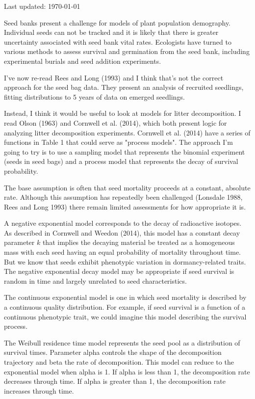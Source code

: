 \documentclass[12pt, oneside, titlepage]{article}   	%
\begin{document}
Last updated: \today

Seed banks present a challenge for models of plant population demography. Individual seeds can not be tracked and it is likely that there is greater uncertainty associated with seed bank vital rates. Ecologists have turned to various methods to assess survival and germination from the seed bank, including experimental burials and seed addition experiments.

I've now re-read Rees and Long (1993) and I think that's not the correct approach for the seed bag data. They present an analysis of recruited seedlings, fitting distributions to 5 years of data on emerged seedlings.

Instead, I think it would be useful to look at models for litter decomposition. I read Olson (1963) and Cornwell et al. (2014), which both present logic for analyzing litter decomposition experiments. Cornwell et al. (2014) have a series of functions in Table 1 that could serve as "process models". The approach I'm going to try is to use a sampling model that represents the binomial experiment (seeds in seed bags) and a process model that represents the decay of survival probability. 

The base assumption is often that seed mortality proceeds at a constant, absolute rate. Although this assumption has repeatedly been challenged (Lonsdale 1988, Rees and Long 1993) there remain limited assessments for how appropriate it is. 

A negative exponential model corresponds to the decay of radioactive isotopes. As described in Cornwell and Weedon (2014), this model has a constant decay parameter $k$ that implies the decaying material be treated as a homogeneous mass with each seed having an equal probability of mortality throughout time. But we know that seeds exhibit phenotypic variation in dormancy-related traits. The negative exponential decay model may be appropriate if seed survival is random in time and largely unrelated to seed characteristics.

The continuous exponential model is one in which seed mortality is described by a continuous quality distribution. For example, if seed survival is a function of a continuous phenotypic trait, we could imagine this model describing the survival process. 

The Weibull residence time model represents the seed pool as a distribution of survival times. Parameter alpha controls the shape of the decomposition trajectory and beta the rate of decomposition. This model can reduce to the exponential model when alpha is 1. If alpha is less than 1, the decomposition rate decreases through time. If alpha is greater than 1, the decomposition rate increases through time. 
\end{document}
